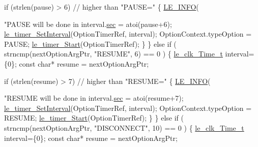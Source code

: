 \begin{DoxyCodeInclude}
{{{{{{{{{{{{            \textcolor{keywordflow}{if} (strlen(pause) > 6) \textcolor{comment}{// higher than "PAUSE="}
            \{
                \hyperlink{le__log_8h_a23e6d206faa64f612045d688cdde5808}{LE\_INFO}(\textcolor{stringliteral}{"PAUSE will be done in %
                interval.\hyperlink{structle__clk___time__t_ae28e527dbd551b3537edc1737611782f}{sec} = atoi(pause+6);
                \hyperlink{le__timer_8h_a0a103d5cef5e83fc9088859d527bbd43}{le\_timer\_SetInterval}(OptionTimerRef, interval);
                OptionContext.typeOption = PAUSE;
                \hyperlink{le__timer_8h_ada2ce7f8cb1e76ed959e323ae94bbfc0}{le\_timer\_Start}(OptionTimerRef);
            \}
        \}
        \textcolor{keywordflow}{else} \textcolor{keywordflow}{if} ( strncmp(nextOptionArgPtr, \textcolor{stringliteral}{"RESUME"}, 6) == 0 )
        \{
            \hyperlink{structle__clk___time__t}{le\_clk\_Time\_t} interval=\{0\};
            \textcolor{keyword}{const} \textcolor{keywordtype}{char}* resume = nextOptionArgPtr;

            \textcolor{keywordflow}{if} (strlen(resume) > 7) \textcolor{comment}{// higher than "RESUME="}
            \{
                \hyperlink{le__log_8h_a23e6d206faa64f612045d688cdde5808}{LE\_INFO}(\textcolor{stringliteral}{"RESUME will be done in %
                interval.\hyperlink{structle__clk___time__t_ae28e527dbd551b3537edc1737611782f}{sec} = atoi(resume+7);
                \hyperlink{le__timer_8h_a0a103d5cef5e83fc9088859d527bbd43}{le\_timer\_SetInterval}(OptionTimerRef, interval);
                OptionContext.typeOption = RESUME;
                \hyperlink{le__timer_8h_ada2ce7f8cb1e76ed959e323ae94bbfc0}{le\_timer\_Start}(OptionTimerRef);
            \}
        \}
        \textcolor{keywordflow}{else} \textcolor{keywordflow}{if} ( strncmp(nextOptionArgPtr, \textcolor{stringliteral}{"DISCONNECT"}, 10) == 0 )
        \{
            \hyperlink{structle__clk___time__t}{le\_clk\_Time\_t} interval=\{0\};
            \textcolor{keyword}{const} \textcolor{keywordtype}{char}* resume = nextOptionArgPtr;

}}}}}}}}}}}}}}
\end{DoxyCodeInclude}
